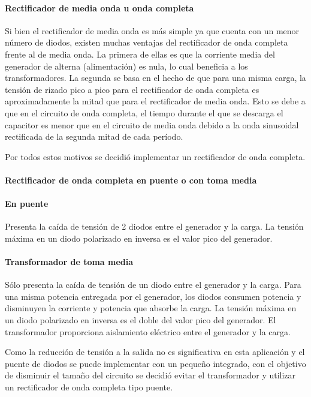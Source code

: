 \paragraph{Rectificador de media onda u onda completa}

Si bien el rectificador de media onda es más simple ya que cuenta con un menor número de diodos, existen muchas ventajas del rectificador de onda completa frente al de media onda. 
La primera de ellas es que la corriente media del generador de alterna (alimentación) es nula, lo cual beneficia a los transformadores. 
La segunda se basa en el hecho de que para una misma carga,
la tensión de rizado pico a pico para el rectificador de onda completa es
aproximadamente la mitad que para el rectificador de media onda. 
Esto se debe a que en el circuito de onda completa,
el tiempo durante el que se descarga el capacitor es menor que en el circuito de media onda
debido a la onda sinusoidal rectificada de la segunda mitad de cada período. 

Por todos estos motivos se decidió implementar un rectificador de onda completa.

\paragraph{Rectificador de onda completa en puente o con toma media}

\paragraph{En puente}

Presenta la caída de tensión de 2 diodos entre el generador y la carga. 
La tensión máxima en un diodo polarizado en inversa es el valor pico del generador.

\paragraph{Transformador de toma media}

Sólo presenta la caída de tensión de un diodo entre el generador y la carga. 
Para una misma potencia entregada por el generador,
los diodos consumen potencia y disminuyen la corriente y potencia que absorbe la carga. 
La tensión máxima en un diodo polarizado en inversa es el doble del valor pico del generador.
El transformador proporciona aislamiento eléctrico entre el generador y la carga. 

Como la reducción de tensión a la salida no es significativa en esta aplicación
y el puente de diodos se puede implementar con un pequeño integrado,
con el objetivo de disminuir el tamaño del circuito se decidió evitar el transformador
y utilizar un rectificador de onda completa tipo puente.

